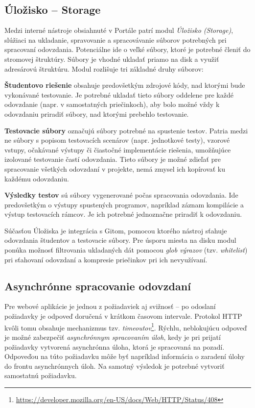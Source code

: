 \documentclass[
  digital, %
  oneside, %
  table,   %
  lof,     %
  lot,   %
]{fithesis3}
\newcommand*{\footurl}[1]{\footnote{\url{#1}}}
\begin{document}
\subsection{Úložisko -- Storage}

Medzi interné nástroje obsiahnuté v Portále patrí modul \emph{Úložisko (Storage)}, slúžiaci na ukladanie, spravovanie a spracovávanie súborov potrebných pri spracovaní odovzdania. Potenciálne ide o veľké súbory, ktoré je potrebné členiť do stromovej štruktúry. Súbory je vhodné ukladať priamo na disk a využiť adresárovú štruktúru. Modul rozlišuje tri základné druhy súborov: 

\textbf{Študentovo riešenie} obsahuje predovšetkým zdrojové kódy, nad ktorými bude vykonávané testovanie. Je potrebné ukladať tieto súbory oddelene pre každé odovzdanie (napr. v samostatných priečinkoch), aby bolo možné vždy k odovzdaniu priradiť súbory, nad ktorými prebehlo testovanie.

\textbf{Testovacie súbory} označujú súbory potrebné na spustenie testov. Patria medzi ne súbory s popisom testovacích scenárov (napr. jednotkové testy), vzorové vstupy, očakávané výstupy či čiastočné implementácie riešenia, umožňujúce izolované testovanie častí odovzdania. Tieto súbory je možné zdieľať pre spracovanie všetkých odovzdaní v projekte, nemá zmysel ich kopírovať ku každému odovzdaniu.

\textbf{Výsledky testov} sú súbory vygenerované počas spracovania odovzdania. Ide predovšetkým o výstupy spustených programov, napríklad záznam kompilácie a výstup testovacích rámcov. Je ich potrebné jednoznačne priradiť k odovzdaniu.

Súčasťou Úložiska je integrácia s Gitom, pomocou ktorého nástroj sťahuje odovzdania študentov a testovacie súbory. Pre úsporu miesta na disku modul ponúka možnosť filtrovania ukladaných dát pomocou \emph{glob výrazov} (tzv. \emph{whitelist}) pri sťahovaní odovzdaní a kompresie priečinkov pri ich nevyužívaní.

\subsection{Asynchrónne spracovanie odovzdaní}
\label{design-async-process}

Pre webové aplikácie je jednou z požiadaviek aj svižnosť -- po odoslaní požiadavky je odpoveď doručená v krátkom časovom intervale. Protokol HTTP kvôli tomu obsahuje mechanizmus tzv. \emph{timeoutov}\footurl{https://developer.mozilla.org/en-US/docs/Web/HTTP/Status/408}. Rýchlu, neblokujúcu odpoveď je možné zabezpečiť \emph{asynchrónnym spracovaním úloh}, kedy je pri prijatí požiadavky vytvorená asynchrónna úloha, ktorá je spracovaná na pozadí. Odpoveďou na túto požiadavku môže byť napríklad informácia o zaradení úlohy do frontu asynchrónnych úloh. Na samotný výsledok je potrebné vytvoriť samostatnú požiadavku.
\end{document}
